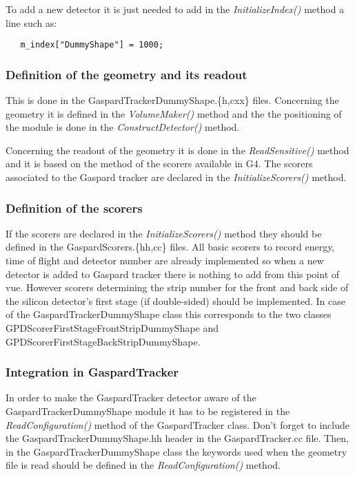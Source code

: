\documentclass[a4paper,12pt]{article}
\begin{document}
To add a new detector it is just needed to add in the {\it InitializeIndex()}
method a line such as:

\begin{verbatim}
   m_index["DummyShape"] = 1000;
\end{verbatim}

\subsubsection{Definition of the geometry and its readout}
This is done in the GaspardTrackerDummyShape.\{h,cxx\} files. Concerning
the geometry it is defined in the {\it VolumeMaker()} method and the 
the positioning of the module is done in the {\it ConstructDetector()} 
method. 

Concerning the readout of the geometry it is done in the {\it ReadSensitive()} 
method and it is based on the method of the scorers available in G4. The 
scorers associated to the Gaspard tracker are declared in the {\it 
InitializeScorers()} method.

\subsubsection{Definition of the scorers}
If the scorers are declared in the {\it InitializeScorers()} method they should
be defined in the GaspardScorers.\{hh,cc\} files. All basic scorers to record
energy, time of flight and detector number are already implemented so when a new
detector is added to Gaspard tracker there is nothing to add from this point
of vue. However scorers determining the strip number for the front and back
side of the silicon detector's first stage (if double-sided) should be implemented.
In case of the GaspardTrackerDummyShape class this corresponds to the two classes
GPDScorerFirstStageFrontStripDummyShape and GPDScorerFirstStageBackStripDummyShape.

\subsubsection{Integration in GaspardTracker}
In order to make the GaspardTracker detector aware of the GaspardTrackerDummyShape
module it has to be registered in the {\it ReadConfiguration()} method of the 
GaspardTracker class. Don't forget to include the GaspardTrackerDummyShape.hh 
header in the GaspardTracker.cc file. Then, in the GaspardTrackerDummyShape class 
the keywords used when the geometry file is read should be defined in the {\it 
ReadConfiguration()} method.
\end{document}
